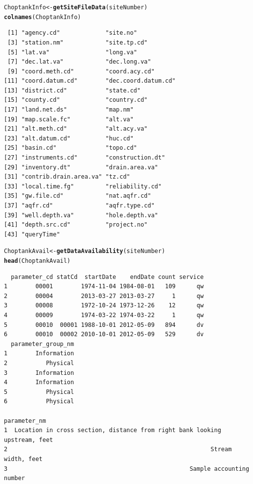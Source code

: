 \documentclass[a4paper,11pt]{article}\usepackage[]{graphicx}\usepackage[]{color}
\makeatletter
\newcommand{\hlstd}[1]{\textcolor[rgb]{0.345,0.345,0.345}{#1}}%
\newcommand{\hlkwb}[1]{\textcolor[rgb]{0.69,0.353,0.396}{#1}}%
\newcommand{\hlkwd}[1]{\textcolor[rgb]{0.737,0.353,0.396}{\textbf{#1}}}%
\newenvironment{kframe}{%
 \def\at@end@of@kframe{}%
 \ifinner\ifhmode%
  \def\at@end@of@kframe{\end{minipage}}%
  \begin{minipage}{\columnwidth}%
 \fi\fi%
 \def\FrameCommand##1{\hskip\@totalleftmargin \hskip-\fboxsep
 \colorbox{shadecolor}{##1}\hskip-\fboxsep
     \hskip-\linewidth \hskip-\@totalleftmargin \hskip\columnwidth}%
 \MakeFramed {\advance\hsize-\width
   \@totalleftmargin\z@ \linewidth\hsize
   \@setminipage}}%
 {\par\unskip\endMakeFramed%
 \at@end@of@kframe}
\newenvironment{knitrout}{}{} %
\makeatother
\begin{document}
\begin{knitrout}
\begin{kframe}
\begin{alltt}
\hlstd{ChoptankInfo} \hlkwb{<-} \hlkwd{getSiteFileData}\hlstd{(siteNumber)}
\hlkwd{colnames}\hlstd{(ChoptankInfo)}
\end{alltt}
\begin{verbatim}
 [1] "agency.cd"             "site.no"              
 [3] "station.nm"            "site.tp.cd"           
 [5] "lat.va"                "long.va"              
 [7] "dec.lat.va"            "dec.long.va"          
 [9] "coord.meth.cd"         "coord.acy.cd"         
[11] "coord.datum.cd"        "dec.coord.datum.cd"   
[13] "district.cd"           "state.cd"             
[15] "county.cd"             "country.cd"           
[17] "land.net.ds"           "map.nm"               
[19] "map.scale.fc"          "alt.va"               
[21] "alt.meth.cd"           "alt.acy.va"           
[23] "alt.datum.cd"          "huc.cd"               
[25] "basin.cd"              "topo.cd"              
[27] "instruments.cd"        "construction.dt"      
[29] "inventory.dt"          "drain.area.va"        
[31] "contrib.drain.area.va" "tz.cd"                
[33] "local.time.fg"         "reliability.cd"       
[35] "gw.file.cd"            "nat.aqfr.cd"          
[37] "aqfr.cd"               "aqfr.type.cd"         
[39] "well.depth.va"         "hole.depth.va"        
[41] "depth.src.cd"          "project.no"           
[43] "queryTime"            
\end{verbatim}
\begin{alltt}
\hlstd{ChoptankAvail} \hlkwb{<-} \hlkwd{getDataAvailability}\hlstd{(siteNumber)}
\hlkwd{head}\hlstd{(ChoptankAvail)}
\end{alltt}
\begin{verbatim}
  parameter_cd statCd  startDate    endDate count service
1        00001        1974-11-04 1984-08-01   109      qw
2        00004        2013-03-27 2013-03-27     1      qw
3        00008        1972-10-24 1973-12-26    12      qw
4        00009        1974-03-22 1974-03-22     1      qw
5        00010  00001 1988-10-01 2012-05-09   894      dv
6        00010  00002 2010-10-01 2012-05-09   529      dv
  parameter_group_nm
1        Information
2           Physical
3        Information
4        Information
5           Physical
6           Physical
                                                                 parameter_nm
1  Location in cross section, distance from right bank looking upstream, feet
2                                                          Stream width, feet
3                                                    Sample accounting number

\end{verbatim}
\end{kframe}
\end{knitrout}
\end{document}
